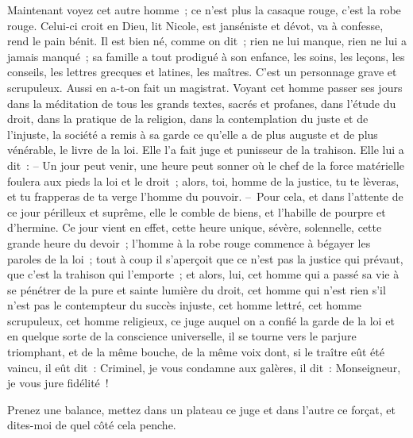 \documentclass[french,twoside]{book} %
\begin{document}
Maintenant voyez cet autre homme ; ce n’est plus la casaque rouge, c’est la robe rouge. Celui-ci croit en Dieu, lit Nicole, est janséniste et dévot, va à confesse, rend le pain bénit. Il est bien né, comme on dit ; rien ne lui manque, rien ne lui a jamais manqué ; sa famille a tout prodigué à son enfance, les soins, les leçons, les conseils, les lettres grecques et latines, les maîtres. C’est un personnage grave et scrupuleux. Aussi en a-t-on fait un magistrat. Voyant cet homme passer ses jours dans la méditation de tous les grands textes, sacrés et profanes, dans l’étude du droit, dans la pratique de la religion, dans la contemplation du juste et de l’injuste, la société a remis à sa garde ce qu’elle a de plus auguste et de plus vénérable, le livre de la loi. Elle l’a fait juge et punisseur de la trahison. Elle lui a dit : – Un jour peut venir, une heure peut sonner où le chef de la force matérielle foulera aux pieds la loi et le droit ; alors, toi, homme de la justice, tu te lèveras, et tu frapperas de ta verge l’homme du pouvoir. – Pour cela, et dans l’attente de ce jour périlleux et suprême, elle le comble de biens, et l’habille de pourpre et d’hermine. Ce jour vient en effet, cette heure unique, sévère, solennelle, cette grande heure du devoir ; l’homme à la robe rouge commence à bégayer les paroles de la loi ; tout à coup il s’aperçoit que ce n’est pas la justice qui prévaut, que c’est la trahison qui l’emporte ; et alors, lui, cet homme qui a passé sa vie à se pénétrer de la pure et sainte lumière du droit, cet homme qui n’est rien s’il n’est pas le contempteur du succès injuste, cet homme lettré, cet homme scrupuleux, cet homme religieux, ce juge auquel on a confié la garde de la loi et en quelque sorte de la conscience universelle, il se tourne vers le parjure triomphant, et de la même bouche, de la même voix dont, si le traître eût été vaincu, il eût dit : Criminel, je vous condamne aux galères, il dit : Monseigneur, je vous jure fidélité !\par
Prenez une balance, mettez dans un plateau ce juge et dans l’autre ce forçat, et dites-moi de quel côté cela penche.
\end{document}
